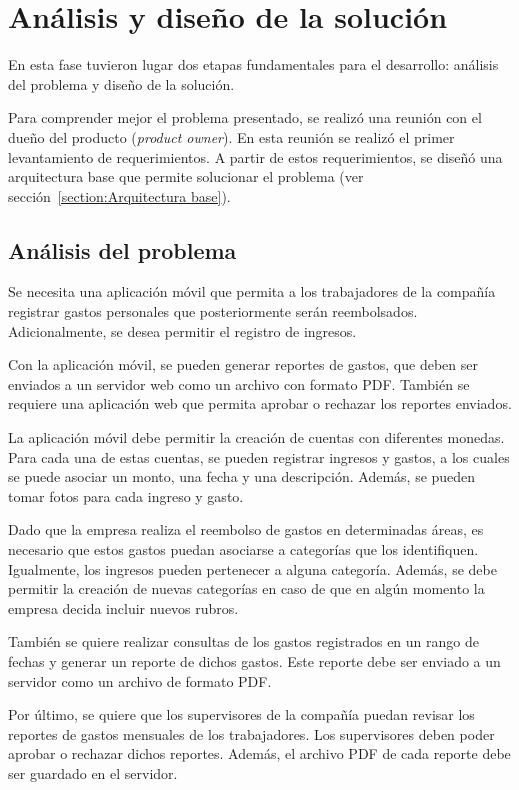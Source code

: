 \section{Análisis y diseño de la solución} \label{sect:Diseno}

En esta fase tuvieron lugar dos etapas fundamentales para el desarrollo: análisis del problema y diseño de la solución.

Para comprender mejor el problema presentado, se realizó una reunión con el dueño del producto (\textit{product owner}). En esta reunión se realizó el primer levantamiento de requerimientos. A partir de estos requerimientos, se diseñó una arquitectura base que permite solucionar el problema (ver sección~\ref{section:Arquitectura base}).

\subsection{Análisis del problema}

Se necesita una aplicación móvil que permita a los trabajadores de la compañía registrar gastos personales que posteriormente serán reembolsados. Adicionalmente, se desea permitir el registro de ingresos. 

Con la aplicación móvil, se pueden generar reportes de gastos, que deben ser enviados a un servidor web como un archivo con formato PDF. También se requiere una aplicación web que permita aprobar o rechazar los reportes enviados.

La aplicación móvil debe permitir la creación de cuentas con diferentes monedas. Para cada una de estas cuentas, se pueden registrar ingresos y gastos, a los cuales se puede asociar un monto, una fecha y una descripción. Además, se pueden tomar fotos para cada ingreso y gasto.

Dado que la empresa realiza el reembolso de gastos en determinadas áreas, es necesario que estos gastos puedan asociarse a categorías que los identifiquen. Igualmente, los ingresos pueden pertenecer a alguna categoría. Además, se debe permitir la creación de nuevas categorías en caso de que en algún momento la empresa decida incluir nuevos rubros.

También se quiere realizar consultas de los gastos registrados en un rango de fechas y generar un reporte de dichos gastos. Este reporte debe ser enviado a un servidor como un archivo de formato PDF.

Por último, se quiere que los supervisores de la compañía puedan revisar los reportes de gastos mensuales de los trabajadores. Los supervisores deben poder aprobar o rechazar dichos reportes. Además, el archivo PDF de cada reporte debe ser guardado en el servidor.

